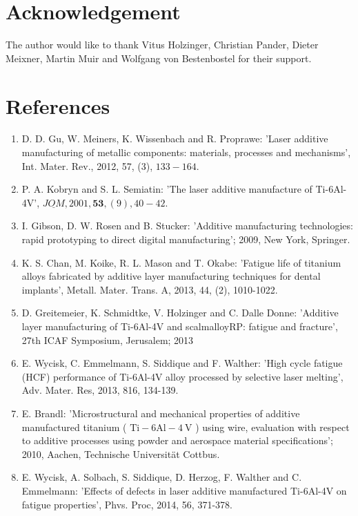 \documentclass[10pt]{article}
\begin{document}
\section*{Acknowledgement}
The author would like to thank Vitus Holzinger, Christian Pander, Dieter Meixner, Martin Muir and Wolfgang von Bestenbostel for their support.

\section*{References}
\begin{enumerate}
  \item D. D. Gu, W. Meiners, K. Wissenbach and R. Proprawe: 'Laser additive manufacturing of metallic components: materials, processes and mechanisms', Int. Mater. Rev., 2012, 57, (3), $133-164$.

  \item P. A. Kobryn and S. L. Semiatin: 'The laser additive manufacture of Ti-6Al-4V', $\underline{J O M}, 2001, \mathbf{5 3},(9), 40-42$.

  \item I. Gibson, D. W. Rosen and B. Stucker: 'Additive manufacturing technologies: rapid prototyping to direct digital manufacturing'; 2009, New York, Springer.

  \item K. S. Chan, M. Koike, R. L. Mason and T. Okabe: 'Fatigue life of titanium alloys fabricated by additive layer manufacturing techniques for dental implants', Metall. Mater. Trans. A, 2013, 44, (2), 1010-1022.

  \item D. Greitemeier, K. Schmidtke, V. Holzinger and C. Dalle Donne: 'Additive layer manufacturing of Ti-6Al-4V and scalmalloyRP: fatigue and fracture', 27th ICAF Symposium, Jerusalem; 2013

  \item E. Wycisk, C. Emmelmann, S. Siddique and F. Walther: 'High cycle fatigue (HCF) performance of Ti-6Al-4V alloy processed by selective laser melting', Adv. Mater. Res, 2013, 816, 134-139.

  \item E. Brandl: 'Microstructural and mechanical properties of additive manufactured titanium ( $\mathrm{Ti}-6 \mathrm{Al}-4 \mathrm{~V}$ ) using wire, evaluation with respect to additive processes using powder and aerospace material specifications'; 2010, Aachen, Technische Universität Cottbus.

  \item E. Wycisk, A. Solbach, S. Siddique, D. Herzog, F. Walther and C. Emmelmann: 'Effects of defects in laser additive manufactured Ti-6Al-4V on fatigue properties', Phvs. Proc, 2014, 56, 371-378.


\end{enumerate}
\end{document}
